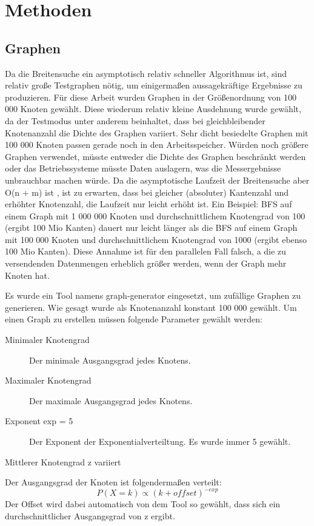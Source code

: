 
\chapter{Methoden} %
\label{cha:methoden}

\section{Graphen} %
\label{sec:graphen}
Da die Breitensuche ein asymptotisch relativ schneller Algorithmus ist, sind relativ große Testgraphen nötig, um einigermaßen aussagekräftige Ergebnisse zu produzieren. Für diese Arbeit wurden Graphen in der Größenordnung von 100 000 Knoten gewählt. Diese wiederum relativ kleine Ausdehnung wurde gewählt, da der Testmodus unter anderem beinhaltet, dass bei gleichbleibender Knotenanzahl die Dichte des Graphen variiert. Sehr dicht besiedelte Graphen mit 100 000 Knoten passen gerade noch in den Arbeitsspeicher. Würden noch größere Graphen verwendet, müsste entweder die Dichte des Graphen beschränkt werden oder das Betriebssysteme müsste Daten auslagern, was die Messergebnisse unbrauchbar machen würde. Da die asymptotische Laufzeit der Breitensuche aber O(n + m) ist \cite{SWB-283374373}, ist zu erwarten, dass bei gleicher (absoluter) Kantenzahl und erhöhter Knotenzahl, die Laufzeit nur leicht erhöht ist. Ein Beispiel: BFS auf einem Graph mit 1 000 000 Knoten und durchschnittlichem Knotengrad von 100 (ergibt 100 Mio Kanten) dauert nur leicht länger als die BFS auf einem Graph mit 100 000 Knoten und durchschnittlichem Knotengrad von 1000 (ergibt ebenso 100 Mio Kanten). Diese Annahme ist für den parallelen Fall falsch, a die zu versendenden Datenmengen erheblich größer werden, wenn der Graph mehr Knoten hat.

Es wurde ein Tool namens graph-generator \cite{graph-generator:2009:Online} eingesetzt, um zufällige Graphen zu generieren. Wie gesagt wurde als Knotenanzahl konstant 100 000 gewählt. Um einen Graph zu erstellen müssen folgende Parameter gewählt werden:
\begin{description}
	\item[Minimaler Knotengrad] Der minimale Ausgangsgrad jedes Knotens.
	\item[Maximaler Knotengrad] Der maximale Ausgangsgrad jedes Knotens.
	\item[Exponent exp = 5] Der Exponent der Exponentialverteiltung. Es wurde immer 5 gewählt.
	\item[Mittlerer Knotengrad z variiert]
\end{description}
Der Ausgangsgrad der Knoten ist folgendermaßen verteilt:
$$
P(X=k) \propto (k + offset)^{-exp}
$$
Der Offset wird dabei automatisch von dem Tool so gewählt, dass sich ein durchschnittlicher Ausgangsgrad von z ergibt.


